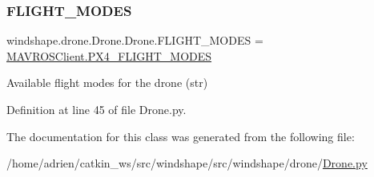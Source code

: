 \subsubsection{\texorpdfstring{F\+L\+I\+G\+H\+T\+\_\+\+M\+O\+D\+ES}{FLIGHT\_MODES}}
{\footnotesize\ttfamily windshape.\+drone.\+Drone.\+Drone.\+F\+L\+I\+G\+H\+T\+\_\+\+M\+O\+D\+ES = \mbox{\hyperlink{classwindshape_1_1drone_1_1fcu_1_1_m_a_v_r_o_s_client_1_1_m_a_v_r_o_s_client_abe3ff6179ff5fb0a038f5f8c2b7728cb}{M\+A\+V\+R\+O\+S\+Client.\+P\+X4\+\_\+\+F\+L\+I\+G\+H\+T\+\_\+\+M\+O\+D\+ES}}\hspace{0.3cm}{\ttfamily [static]}}



Available flight modes for the drone (str) 



Definition at line 45 of file Drone.\+py.



The documentation for this class was generated from the following file\+:\begin{DoxyCompactItemize}
\item 
/home/adrien/catkin\+\_\+ws/src/windshape/src/windshape/drone/\mbox{\hyperlink{_drone_8py}{Drone.\+py}}\end{DoxyCompactItemize}
